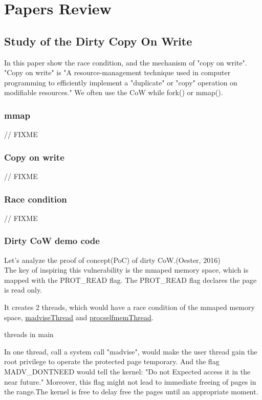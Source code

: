 \documentclass[12pt,a4paper,oneside,draft]{IEEEconf}
\begin{document}
\section{Papers Review}
\subsection{Study of the Dirty Copy On Write\cite{Study_Dirty_Cow}}
In this paper show the race condition, and the mechanism of "copy on write".
"Copy on write" is "A resource-management technique used in computer programming to
efficiently implement a "duplicate" or "copy" operation on modifiable resources."
\cite{CoW_wiki} We often use the CoW while fork() or mmap().

\subsubsection{mmap}
// FIXME

\subsubsection{Copy on write}
// FIXME

\subsubsection{Race condition}
// FIXME


\subsubsection{\hypertarget{dirty cow}{Dirty CoW} demo code\cite{Dirty_CoW}}
Let's analyze the proof of concept(PoC) of dirty CoW.(Oester, 2016)\\
The key of inspiring this vulnerability is the mmaped memory space, which is mapped with
the PROT\_READ flag. The PROT\_READ flag declares the page is read only.


It creates 2 threads, which would have a race condition of the mmaped memory space,
\hyperlink{madvise}{madviseThread} and \hyperlink{procself}{procselfmemThread}.

\hypertarget{threads_main}{threads in main}


In one thread, call a system call "madvise", would make the user thread gain the root
privilege to operate the protected page temporary. And the flag MADV\_DONTNEED would
tell the kernel: "Do not Expected access it in the near future.\cite{Madvise}" Moreover,
this flag might not lead to immediate freeing of pages in the range.The kernel is free
to delay free the pages until an appropriate moment.\cite{Madvise}
\end{document}
